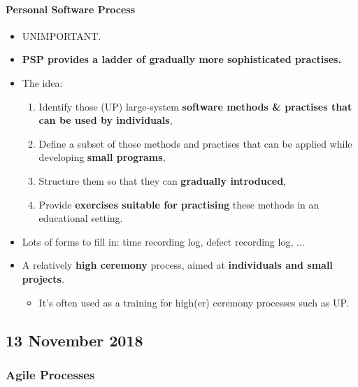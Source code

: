 \documentclass[a4paper]{article}
\providecommand{\tightlist}{%
  \setlength{\itemsep}{0pt}\setlength{\parskip}{0pt}}
\let\oldparagraph\paragraph
\renewcommand{\paragraph}[1]{\oldparagraph{#1}\mbox{}}
\begin{document}
\hypertarget{personal-software-process}{%
\paragraph{Personal Software Process}\label{personal-software-process}}

\begin{itemize}
\item
  UNIMPORTANT.
\item
  \textbf{PSP provides a ladder of gradually more sophisticated
  practises.}
\item
  The idea:

  \begin{enumerate}
  \def\labelenumi{\arabic{enumi}.}
  \tightlist
  \item
    Identify those (UP) large-system \textbf{software methods \&
    practises that can be used by individuals},
  \item
    Define a subset of those methods and practises that can be applied
    while developing \textbf{small programs},
  \item
    Structure them so that they can \textbf{gradually introduced},
  \item
    Provide \textbf{exercises suitable for practising} these methods in
    an educational setting.
  \end{enumerate}
\item
  Lots of forms to fill in: time recording log, defect recording log,
  ...
\item
  A relatively \textbf{high ceremony} process, aimed at
  \textbf{individuals and small projects}.

  \begin{itemize}
  \tightlist
  \item
    It's often used as a training for high(er) ceremony processes such
    as UP.
  \end{itemize}
\end{itemize}

\hypertarget{13-november-2018}{%
\subsection{13 November 2018}\label{13-november-2018}}

\hypertarget{agile-processes}{%
\subsubsection{Agile Processes}\label{agile-processes}}
\end{document}
